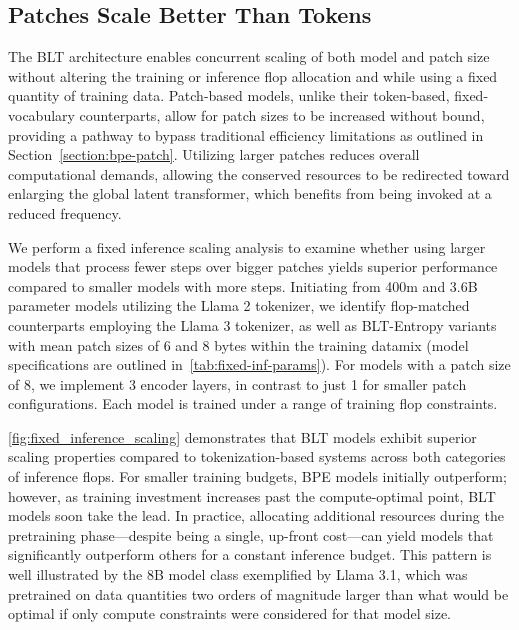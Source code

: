 \subsection{Patches Scale Better Than Tokens} The {\textsc BLT} architecture enables concurrent scaling of both model and patch size without altering the training or inference flop allocation and while using a fixed quantity of training data. Patch-based models, unlike their token-based, fixed-vocabulary counterparts, allow for patch sizes to be increased without bound, providing a pathway to bypass traditional efficiency limitations as outlined in Section~\ref{section:bpe-patch}. Utilizing larger patches reduces overall computational demands, allowing the conserved resources to be redirected toward enlarging the global latent transformer, which benefits from being invoked at a reduced frequency.

We perform a fixed inference scaling analysis to examine whether using larger models that process fewer steps over bigger patches yields superior performance compared to smaller models with more steps. Initiating from 400m and 3.6B parameter models utilizing the Llama 2 tokenizer, we identify flop-matched counterparts employing the Llama 3 tokenizer, as well as {\textsc BLT}-Entropy variants with mean patch sizes of 6 and 8 bytes within the training datamix (model specifications are outlined in~\autoref{tab:fixed-inf-params}). For models with a patch size of 8, we implement 3 encoder layers, in contrast to just 1 for smaller patch configurations. Each model is trained under a range of training flop constraints.

\autoref{fig:fixed_inference_scaling} demonstrates that {\textsc BLT} models exhibit superior scaling properties compared to tokenization-based systems across both categories of inference flops. For smaller training budgets, BPE models initially outperform; however, as training investment increases past the compute-optimal point, {\textsc BLT} models soon take the lead. In practice, allocating additional resources during the pretraining phase—despite being a single, up-front cost—can yield models that significantly outperform others for a constant inference budget. This pattern is well illustrated by the 8B model class exemplified by Llama 3.1, which was pretrained on data quantities two orders of magnitude larger than what would be optimal if only compute constraints were considered for that model size.

